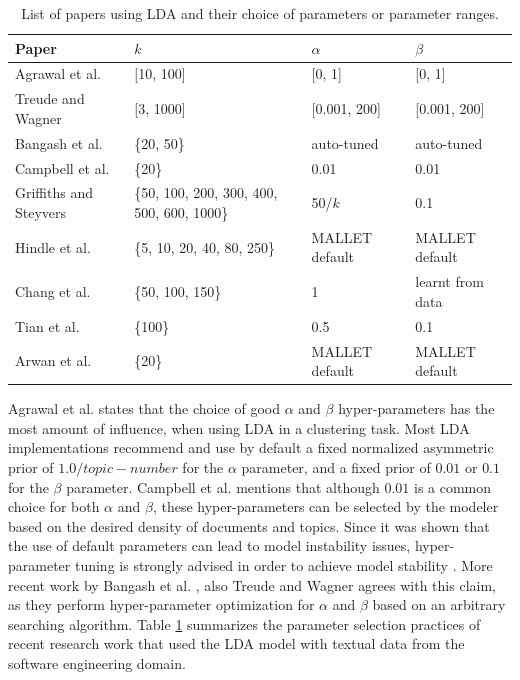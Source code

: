             \begin{table}
              \centering
              \caption{List of papers using LDA and their choice of parameters or parameter ranges.}\label{tab:LDA_params}
                \vspace{6pt} %
              \begin{tabular}{p{4.4 cm} p{3.6 cm} p{2.0cm} p{3.0cm}}
                \hline
                Paper & $k$ & $\alpha$ & $\beta$ \\
                \hline\hline
                Agrawal et al. \cite{agrawal2018wrong} & [10, 100] & [0, 1] & [0, 1] \\
                Treude and Wagner \cite{treude2019predicting} & [3, 1000] & [0.001, 200] & [0.001, 200] \\
                Bangash et al. \cite{bangash2019developers} & \{20, 50\} & auto-tuned & auto-tuned \\
                Campbell et al. \cite{campbell2015latent} & \{20\} & 0.01 & 0.01 \\
                Griffiths and Steyvers \cite{griffiths2004finding} & \{50, 100, 200, 300, 400, 500, 600, 1000\} & 50/$k$ & 0.1 \\
                Hindle et al. \cite{hindle2012relating} & \{5, 10, 20, 40, 80, 250\} & MALLET default & MALLET default \\
                Chang et al. \cite{chang2009reading} & \{50, 100, 150\} & 1 & learnt from data \\
                Tian et al. \cite{tian2013predicting} & \{100\} & 0.5 & 0.1 \\
                Arwan et al. \cite{arwan2015source} & \{20\} & MALLET default & MALLET default \\
                \hline
              \end{tabular}
            \end{table}
            
            Agrawal et al. \cite{agrawal2018wrong} states that the choice of good $\alpha$ and $\beta$ hyper-parameters has the most amount of influence, when using LDA in a clustering task. Most LDA implementations recommend and use by default a fixed normalized asymmetric prior of $1.0 / topic-number$ for the $\alpha$ parameter, and a fixed prior of $0.01$ or $0.1$ for the $\beta$ parameter. Campbell et al. \cite{campbell2015latent} mentions that although $0.01$ is a common choice for both $\alpha$ and $\beta$, these hyper-parameters can be selected by the modeler based on the desired density of documents and topics. Since it was shown that the use of default parameters can lead to model instability issues, hyper-parameter tuning is strongly advised in order to achieve model stability \cite{agrawal2018wrong}. More recent work by Bangash et al. \cite{bangash2019developers}, also Treude and Wagner \cite{treude2019predicting} agrees with this claim, as they perform hyper-parameter optimization for $\alpha$ and $\beta$ based on an arbitrary searching algorithm. Table \ref{tab:LDA_params} summarizes the parameter selection practices of recent research work that used the LDA model with textual data from the software engineering domain.
        
